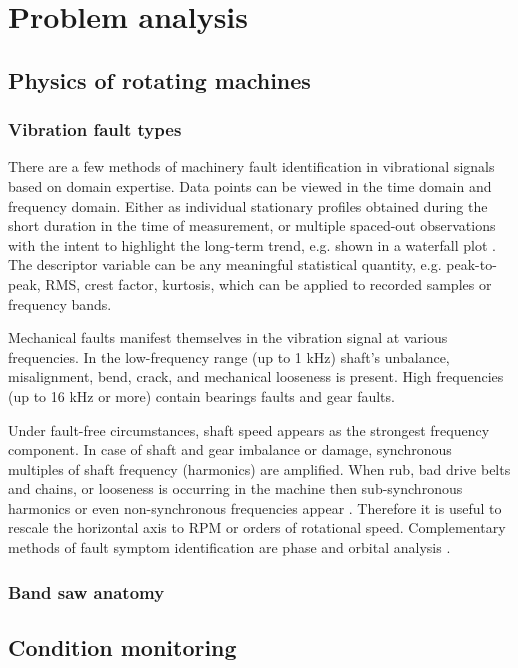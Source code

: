 \chapter{Problem analysis}

\section{Physics of rotating machines}

	\subsection{Vibration fault types}
	There are a few methods of machinery fault identification in vibrational signals based on domain expertise. Data points can be viewed in the time domain and frequency domain. Either as individual stationary profiles obtained during the short duration in the time of measurement, or multiple spaced-out observations with the intent to highlight the long-term trend, e.g. shown in a waterfall plot \cite{ziaran_technicka_2013}. The descriptor variable can be any meaningful statistical quantity, e.g. peak-to-peak, RMS, crest factor, kurtosis, which can be applied to recorded samples or frequency bands.  

Mechanical faults manifest themselves in the vibration signal at various frequencies. In the low-frequency range (up to 1 kHz) shaft's unbalance, misalignment, bend, crack, and mechanical looseness is present. High frequencies (up to 16 kHz or more) contain bearings faults and gear faults. 

Under fault-free circumstances, shaft speed appears as the strongest frequency component. In case of shaft and gear imbalance or damage, synchronous multiples of shaft frequency (harmonics) are amplified. When rub, bad drive belts and chains, or looseness is occurring in the machine then sub-synchronous harmonics or even non-synchronous frequencies appear \cite{mohanty_machinery_2015}.  Therefore it is useful to rescale the horizontal axis to RPM or orders of rotational speed. Complementary methods of fault symptom identification are phase and orbital analysis \cite{scheffer_practical_2004}.

	\subsection{Band saw anatomy}

\section{Condition monitoring}

